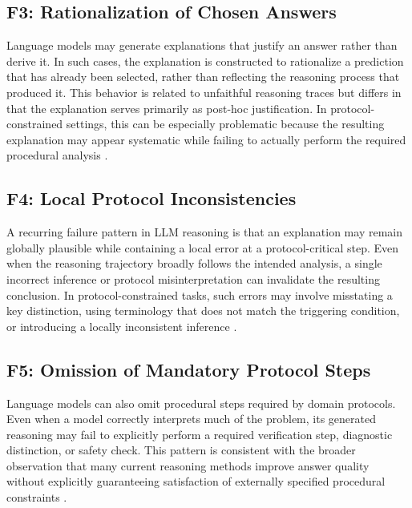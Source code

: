 \documentclass[twocolumn]{article}
\begin{document}
\subsection*{F3: Rationalization of Chosen
Answers}\label{sec:f3_rationalization}

Language models may generate explanations that justify an answer rather than
derive it. In such cases, the explanation is constructed to rationalize a
prediction that has already been selected, rather than reflecting the reasoning
process that produced it. This behavior is related to unfaithful reasoning
traces but differs in that the explanation serves primarily as post-hoc
justification. In protocol-constrained settings, this can be especially
problematic because the resulting explanation may appear systematic while
failing to actually perform the required procedural analysis
\parencite{lanham2023measuringfaithfulnesscot,arcuschin2025cotwild}.

\subsection*{F4: Local Protocol
Inconsistencies}\label{sec:f4_local_protocol_inconsistencies}

A recurring failure pattern in LLM reasoning is that an explanation may remain
globally plausible while containing a local error at a protocol-critical step.
Even when the reasoning trajectory broadly follows the intended analysis, a
single incorrect inference or protocol misinterpretation can invalidate the
resulting conclusion. In protocol-constrained tasks, such errors may involve
misstating a key distinction, using terminology that does not match the
triggering condition, or introducing a locally inconsistent inference
\parencite{turpin2023language,lyu2023faithfulcot,
paul2024makingreasoningmatter,wiegreffe2024faithfulness}.

\subsection*{F5: Omission of Mandatory Protocol
Steps}\label{sec:f5_missing_protocol_steps}

Language models can also omit procedural steps required by domain protocols.
Even when a model correctly interprets much of the problem, its generated
reasoning may fail to explicitly perform a required verification step,
diagnostic distinction, or safety check. This pattern is consistent with the
broader observation that many current reasoning methods improve answer quality
without explicitly guaranteeing satisfaction of externally specified procedural
constraints \parencite{yao2023react,yao2023treeofthoughts,srivatsa2024deal,
bai2022constitutionalai}.
\end{document}
